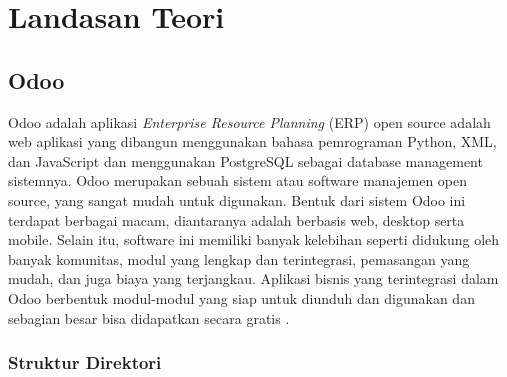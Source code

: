 \chapter{Landasan Teori}
\label{sec:landasanteori}

\section{Odoo}
\label{sec:odoo}

Odoo adalah aplikasi \textit{Enterprise Resource Planning} (ERP) open source adalah web aplikasi yang dibangun menggunakan bahasa pemrograman Python, XML, dan JavaScript dan menggunakan PostgreSQL sebagai database management sistemnya.  Odoo merupakan sebuah sistem atau software manajemen open source, yang sangat mudah untuk digunakan. Bentuk dari sistem Odoo ini terdapat berbagai macam, diantaranya adalah berbasis web, desktop serta mobile. Selain itu, software ini memiliki banyak kelebihan seperti didukung oleh banyak komunitas, modul yang lengkap dan terintegrasi, pemasangan yang mudah, dan juga biaya yang terjangkau. Aplikasi bisnis yang terintegrasi dalam Odoo berbentuk modul-modul yang siap untuk diunduh dan digunakan dan sebagian besar bisa didapatkan secara gratis \cite{suminten}.

\subsection{Struktur Direktori}
\label{sec:strukturDirektori}

